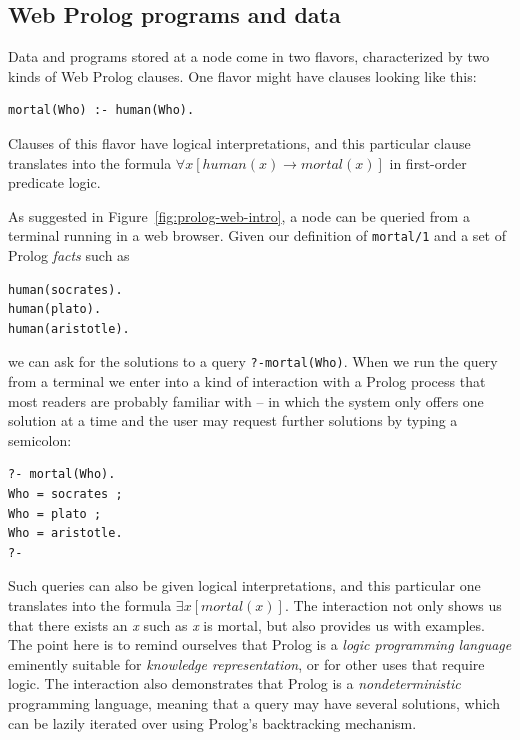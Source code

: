 \subsection{Web Prolog programs and data}

Data and programs stored at a node come in two flavors, characterized by two kinds of Web Prolog clauses. One flavor might have clauses looking like this:

\begin{verbatim}
mortal(Who) :- human(Who).
\end{verbatim}

\noindent Clauses of this flavor have logical interpretations, and this particular clause translates into the formula $\forall x [human(x) \rightarrow mortal(x)]$ in first-order predicate logic. 

As suggested in Figure~\ref{fig:prolog-web-intro}, a node can be queried from a terminal running in a web browser. Given our definition of \texttt{mortal/1} and a set of Prolog \textit{facts} such as

\begin{verbatim}
human(socrates).
human(plato).
human(aristotle).
\end{verbatim}

\noindent we can ask for the solutions to a query \texttt{?-mortal(Who)}. When we run the query from a terminal we enter into a kind of interaction with a Prolog process that most readers are probably familiar with -- in which the system only offers one solution at a time and the user may request further solutions by typing a semicolon:

\begin{verbatim}
?- mortal(Who).
Who = socrates ;
Who = plato ;
Who = aristotle.
?-
\end{verbatim}

\noindent Such queries can also be given logical interpretations, and this particular one translates into the formula $\exists x [mortal(x)]$. The interaction not only shows us that there exists an \textit{x} such as \textit{x} is mortal, but also provides us with examples. The point here is to remind ourselves that Prolog is a \textit{logic programming language} eminently suitable for \textit{knowledge representation}, or for other uses that require logic. The interaction also demonstrates that Prolog is a \textit{nondeterministic} programming language, meaning that a query may have several solutions, which can be lazily iterated over using Prolog's backtracking mechanism. 

